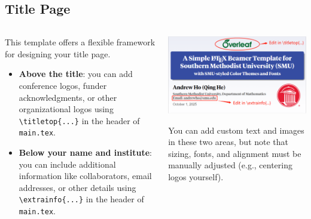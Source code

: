 \documentclass[12pt, aspectratio=169]{beamer}
\begin{document}
\subsection{Title Page}
\begin{frame}[fragile]{\insertsubsection}{}
\begin{columns}
    \begin{column}{0.5\textwidth}\justifying
        This template offers a flexible framework for designing your title page.
        \begin{itemize}\justifying
            \item \textbf{Above the title}: you can add conference logos, funder acknowledgments, or other organizational logos using \verb|\titletop{...}| in the header of \texttt{main.tex}.
            \item \textbf{Below your name and institute}: you can include additional information like collaborators, email addresses, or other details using \verb|\extrainfo{...}| in the header of \texttt{main.tex}.
        \end{itemize}
        
    \end{column}
    \begin{column}{0.49\textwidth}
        \begin{center}
        \includegraphics[width=\textwidth]{template-source/Template_title_editting.png}
        \begin{alertblock}{}
            \small \justifying You can add custom text and images in these two areas, but note that sizing, fonts, and alignment must be manually adjusted (e.g., centering logos yourself).
        \end{alertblock}
    \end{center}
    \end{column}
\end{columns}

\end{frame}
\end{document}
